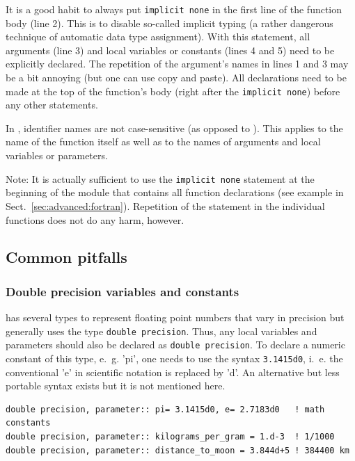\documentclass[times,onecolumn]{article}
\begin{document}
It is a good habit to always put \verb|implicit none| in the first line of the function body (line 2). This is to disable so-called implicit typing (a rather dangerous technique of automatic data type assignment). With this statement, all arguments (line 3) and local variables or constants (lines 4 and 5) need to be explicitly declared. The repetition of the argument's names in lines 1 and 3 may be a bit annoying (but one can use copy and paste). All declarations need to be made at the top of the function's body (right after the \verb|implicit none|) before any other statements.

In , identifier names are not case-sensitive (as opposed to ). This applies to the name of the function itself as well as to the names of arguments and local variables or parameters.

Note: It is actually sufficient to use the \verb|implicit none| statement at the beginning of the module that contains all function declarations (see example in Sect.~\ref{sec:advanced:fortran}). Repetition of the statement in the individual functions does not do any harm, however. 

\subsection{Common pitfalls}

\subsubsection{Double precision variables and constants}

 has several types to represent floating point numbers that vary in precision but  generally uses the type \verb|double precision|. Thus, any local variables and parameters should also be declared as \verb|double precision|. To declare a numeric constant of this type, e.~g. 'pi', one needs to use the syntax \verb|3.1415d0|, i.~e. the conventional 'e' in scientific notation is replaced by 'd'. An alternative but less portable syntax exists but it is not mentioned here.

\begin{shaded}
\begin{small}
\begin{verbatim}
double precision, parameter:: pi= 3.1415d0, e= 2.7183d0   ! math constants 
double precision, parameter:: kilograms_per_gram = 1.d-3  ! 1/1000
double precision, parameter:: distance_to_moon = 3.844d+5 ! 384400 km
\end{verbatim}
\end{small}
\end{shaded}
\end{document}
